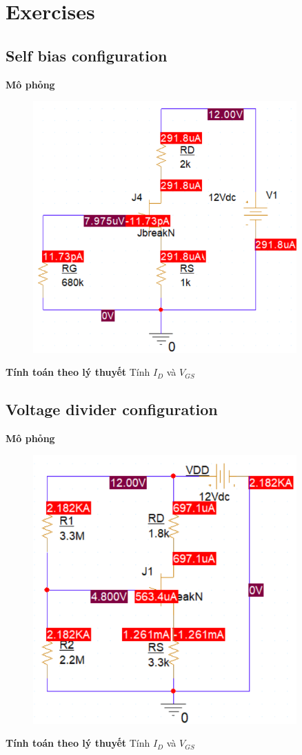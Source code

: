 \section{Exercises}
\subsection{Self bias configuration}
\textbf{Mô phỏng}
\begin{figure}[h]
    \centering
    \includegraphics[width=0.9\textwidth]{graphics/ex1/f1.PNG}
\end{figure}

\textbf{Tính toán theo lý thuyết}
Tính $I_D$ và $V_{GS}$

\subsection{Voltage divider configuration}
\textbf{Mô phỏng}
\begin{figure}[h]
    \centering
    \includegraphics[width=0.9\textwidth]{graphics/ex1/f2.PNG}
\end{figure}

\textbf{Tính toán theo lý thuyết}
Tính $I_D$ và $V_{GS}$